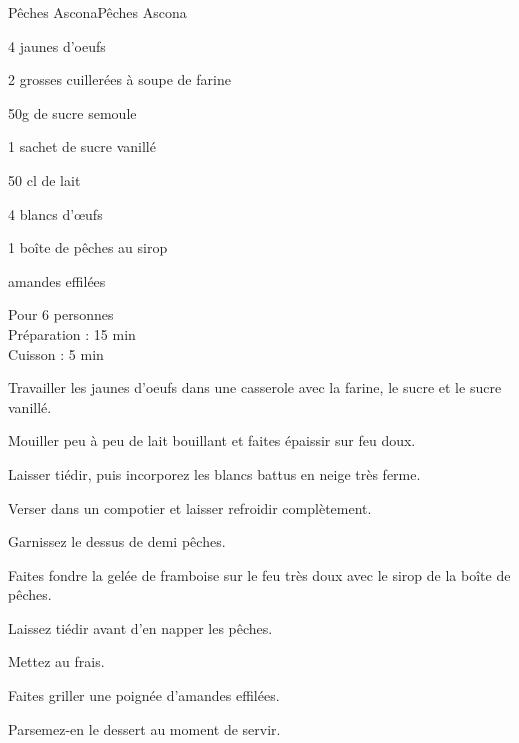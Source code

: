 \begin{recette}{Pêches Ascona}{Pêches Ascona}

\begin{ingredients}
4 jaunes d’oeufs\par
2 grosses cuillerées à soupe de farine\par
50g de sucre semoule\par
1 sachet de sucre vanillé\par
50 cl de lait\par
4 blancs d’œufs\par
1 boîte de pêches au sirop\par
amandes effilées\par
\end{ingredients}

\begin{infos}
Pour 6 personnes\\
Préparation : 15 min\\
Cuisson : 5 min\\
\end{infos}

\begin{etapes}
\item Travailler les jaunes d’oeufs dans une casserole avec la farine, le sucre et le sucre vanillé.
\item Mouiller peu à peu de lait bouillant et faites épaissir sur feu doux.
\item Laisser tiédir, puis incorporez les blancs battus en neige très ferme.
\item Verser dans un compotier et laisser refroidir complètement.
\item Garnissez le dessus de demi pêches.
\item Faites fondre la gelée de framboise sur le feu très doux avec le sirop de la boîte de pêches.
\item Laissez tiédir avant d’en napper les pêches.
\item Mettez au frais.
\item Faites griller une poignée d’amandes effilées.
\item Parsemez-en le dessert au moment de servir.
\end{etapes}

\end{recette}